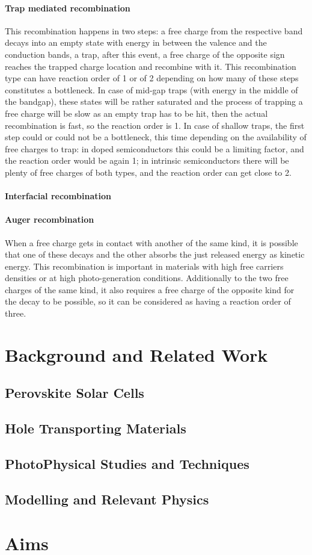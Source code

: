 \paragraph{Trap mediated recombination} This recombination happens in two steps: a free charge from the respective band decays into an empty state with energy in between the valence and the conduction bands, a trap, after this event, a free charge of the opposite sign reaches the trapped charge location and recombine with it. This recombination type can have reaction order of 1 or of 2 depending on how many of these steps constitutes a bottleneck\cite{Calado2018b}. In case of mid-gap traps (with energy in the middle of the bandgap), these states will be rather saturated and the process of trapping a free charge will be slow as an empty trap has to be hit, then the actual recombination is fast, so the reaction order is 1. In case of shallow traps, the first step could or could not be a bottleneck, this time depending on the availability of free charges to trap: in doped semiconductors this could be a limiting factor, and the reaction order would be again 1; in intrinsic semiconductors there will be plenty of free charges of both types, and the reaction order can get close to 2. 

\paragraph{Interfacial recombination} 

\paragraph{Auger recombination} When a free charge gets in contact with another of the same kind, it is possible that one of these decays and the other absorbs the just released energy as kinetic energy. This recombination is important in materials with high free carriers densities or at high photo-generation conditions. Additionally to the two free charges of the same kind, it also requires a free charge of the opposite kind for the decay to be possible, so it can be considered as having a reaction order of three.

\section{Background and Related Work}\label{sec:background}

\subsection{Perovskite Solar Cells}

\subsection{Hole Transporting Materials}

\subsection{PhotoPhysical Studies and Techniques}

\subsection{Modelling and Relevant Physics}


\section{Aims}
